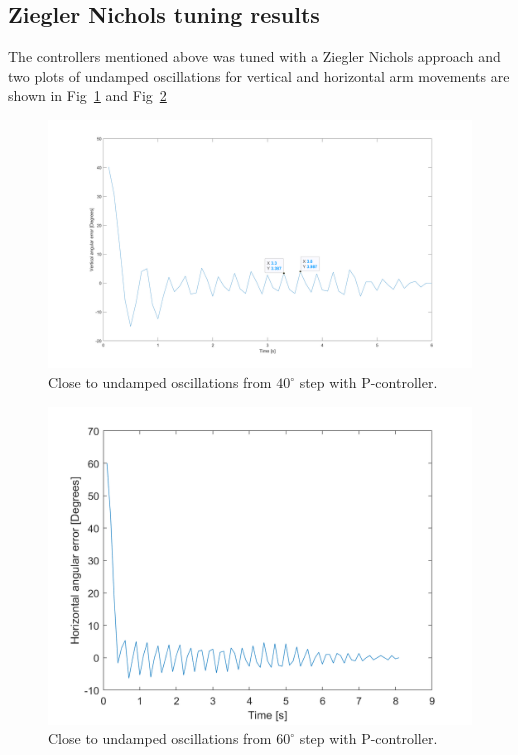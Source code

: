 \subsection{Ziegler Nichols tuning results}
The controllers mentioned above was tuned with a Ziegler Nichols approach and two plots of undamped oscillations for vertical and horizontal arm movements are shown in Fig~\ref{vert_osc} and Fig~\ref{Hor_osc}
\begin{figure}[H]
\centering
\includegraphics[width=\textwidth]{assets/Vertical_undamped_oscillation.png}
\caption{Close to undamped oscillations from \(40^{\circ}\) step with P-controller.}
\label{vert_osc}
\end{figure}
\begin{figure}[H]
\centering
\includegraphics[width=\textwidth]{assets/Horizontal_undamped_oscillation.png}
\caption{Close to undamped oscillations from \(60^{\circ}\) step with P-controller.}
\label{Hor_osc}
\end{figure}
